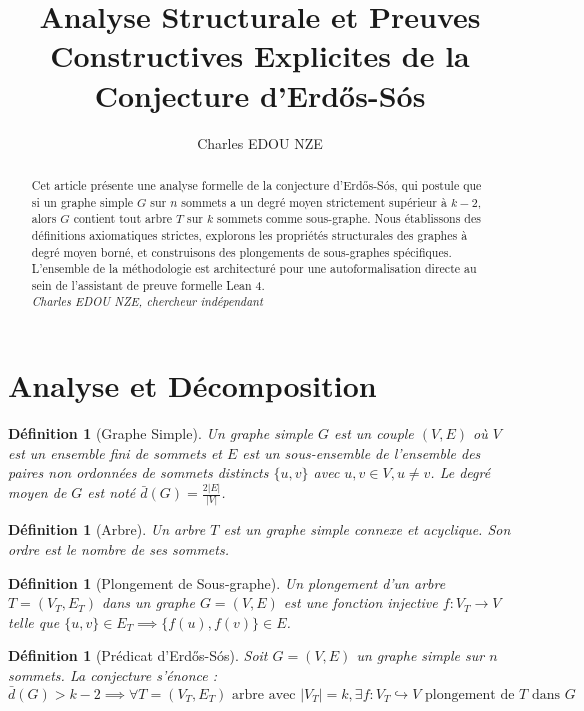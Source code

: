 \documentclass[11pt,a4paper]{article}
\title{Analyse Structurale et Preuves Constructives Explicites de la Conjecture d'Erd\H{o}s-S\'os}
\author{Charles EDOU NZE}
\date{}
\newtheorem{definition}[theorem]{D\'efinition}
\begin{document}
\maketitle

\begin{abstract}
Cet article pr\'esente une analyse formelle de la conjecture d'Erd\H{o}s-S\'os, qui postule que si un graphe simple $G$ sur $n$ sommets a un degr\'e moyen strictement sup\'erieur \`a $k-2$, alors $G$ contient tout arbre $T$ sur $k$ sommets comme sous-graphe. Nous \'etablissons des d\'efinitions axiomatiques strictes, explorons les propri\'et\'es structurales des graphes \`a degr\'e moyen born\'e, et construisons des plongements de sous-graphes sp\'ecifiques. L'ensemble de la m\'ethodologie est architectur\'e pour une autoformalisation directe au sein de l'assistant de preuve formelle Lean 4.
\vspace{0.5cm}\\
\noindent \textit{Charles EDOU NZE, chercheur ind\'ependant}
\end{abstract}

\tableofcontents

\section{Analyse et D\'ecomposition}

\begin{definition}[Graphe Simple]
Un graphe simple $G$ est un couple $(V, E)$ o\`u $V$ est un ensemble fini de sommets et $E$ est un sous-ensemble de l'ensemble des paires non ordonn\'ees de sommets distincts $\{u, v\}$ avec $u, v \in V, u \neq v$. Le degr\'e moyen de $G$ est not\'e $\bar{d}(G) = \frac{2|E|}{|V|}$.
\end{definition}

\begin{definition}[Arbre]
Un arbre $T$ est un graphe simple connexe et acyclique. Son ordre est le nombre de ses sommets.
\end{definition}

\begin{definition}[Plongement de Sous-graphe]
Un plongement d'un arbre $T = (V_T, E_T)$ dans un graphe $G = (V, E)$ est une fonction injective $f : V_T \to V$ telle que $\{u, v\} \in E_T \implies \{f(u), f(v)\} \in E$.
\end{definition}

\begin{definition}[Pr\'edicat d'Erd\H{o}s-S\'os]
Soit $G = (V, E)$ un graphe simple sur $n$ sommets. La conjecture s'\'enonce :
$$ \bar{d}(G) > k - 2 \implies \forall T = (V_T, E_T) \text{ arbre avec } |V_T| = k, \exists f : V_T \hookrightarrow V \text{ plongement de } T \text{ dans } G $$
\end{definition}
\end{document}
